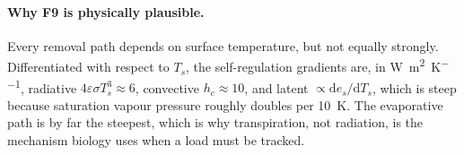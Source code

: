 \paragraph{Why F9 is physically plausible.} Every removal path depends on
surface temperature, but not equally strongly. Differentiated with respect to
$T_s$, the self-regulation gradients are, in
\unit{\watt\per\square\metre\per\kelvin}, radiative
$4\varepsilon\sigma T_s^{3} \approx 6$, convective $h_c \approx 10$, and latent
$\propto \mathrm{d}e_s/\mathrm{d}T_s$, which is steep because saturation vapour
pressure roughly doubles per \qty{10}{\kelvin}. The evaporative path is by far
the steepest, which is why transpiration, not radiation, is the mechanism
biology uses when a load must be tracked. 

